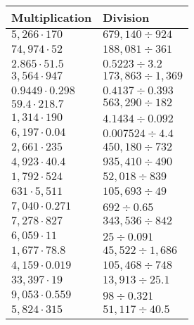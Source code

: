 \begin{longtable}[]{@{}ll@{}}
\toprule
Multiplication & Division\tabularnewline
\midrule
\endhead
\(5,266\cdot170\) & \(679,140÷924\)\tabularnewline
\(74,974\cdot52\) & \(188,081÷361\)\tabularnewline
\(2.865\cdot51.5\) & \(0.5223÷3.2\)\tabularnewline
\(3,564\cdot947\) & \(173,863÷1,369\)\tabularnewline
\(0.9449\cdot0.298\) & \(0.4137÷0.393\)\tabularnewline
\(59.4\cdot218.7\) & \(563,290÷182\)\tabularnewline
\(1,314\cdot190\) & \(4.1434÷0.092\)\tabularnewline
\(6,197\cdot0.04\) & \(0.007524÷4.4\)\tabularnewline
\(2,661\cdot235\) & \(450,180÷732\)\tabularnewline
\(4,923\cdot40.4\) & \(935,410÷490\)\tabularnewline
\(1,792\cdot524\) & \(52,018÷839\)\tabularnewline
\(631\cdot5,511\) & \(105,693÷49\)\tabularnewline
\(7,040\cdot0.271\) & \(692÷0.65\)\tabularnewline
\(7,278\cdot827\) & \(343,536÷842\)\tabularnewline
\(6,059\cdot11\) & \(25÷0.091\)\tabularnewline
\(1,677\cdot78.8\) & \(45,522÷1,686\)\tabularnewline
\(4,159\cdot0.019\) & \(105,468÷748\)\tabularnewline
\(33,397\cdot19\) & \(13,913÷25.1\)\tabularnewline
\(9,053\cdot0.559\) & \(98÷0.321\)\tabularnewline
\(5,824\cdot315\) & \(51,117÷40.5\)\tabularnewline
\bottomrule
\end{longtable}
